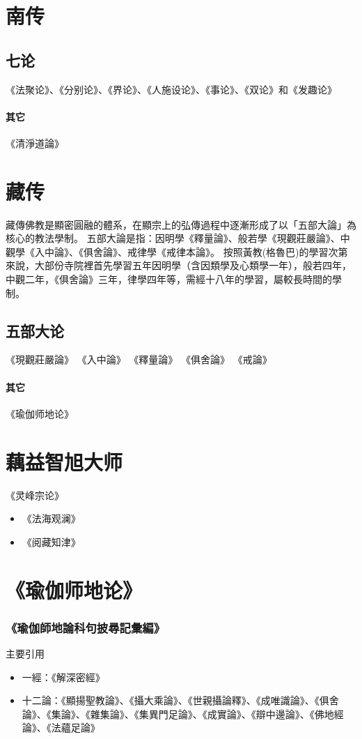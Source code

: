 \section{南传}
\subsection{七论}
《法聚论》、《分别论》、《界论》、《人施设论》、《事论》、《双论》和《发趣论》
\paragraph{其它}
《清淨道論》

\section{藏传}
藏傳佛教是顯密圓融的體系，在顯宗上的弘傳過程中逐漸形成了以「五部大論」為核心的教法學制。
五部大論是指：因明學《釋量論》、般若學《現觀莊嚴論》、中觀學《入中論》、《俱舍論》、戒律學《戒律本論》。
按照黃教(格魯巴)的學習次第來說，大部份寺院裡首先學習五年因明學（含因類學及心類學一年），般若四年，中觀二年，《俱舍論》三年，律學四年等，需經十八年的學習，屬較長時間的學制。
\subsection{五部大论}
《現觀莊嚴論》
《入中論》
《釋量論》
《俱舍論》
《戒論》
\paragraph{其它}
《瑜伽师地论》



\section{藕益智旭大师}
《灵峰宗论》
\begin{itemize}
  \item 《法海观澜》
  \item 《阅藏知津》
\end{itemize}

\section{《瑜伽师地论》}
\subsubsection{《瑜伽師地論科句披尋記彙編》}
主要引用
\begin{itemize}
  \item 一經：《解深密經》
  \item 十二論：《顯揚聖教論》、《攝大乘論》、《世親攝論釋》、《成唯識論》、《俱舍論》、《集論》、《雜集論》、《集異門足論》、《成實論》、《辯中邊論》、《佛地經論》、《法蘊足論》
\end{itemize}
